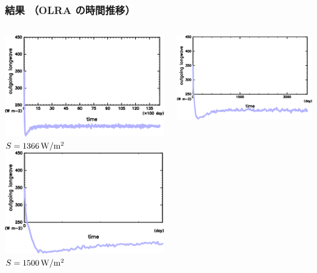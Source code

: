 \documentclass[aspectratio=149,9pt,fleqn]{beamer}
\begin{document}
\begin{frame}
	\frametitle{結果 （OLRA の時間推移）}
	\begin{columns}[T]
		\begin{column}{.3\textwidth}
			\centering
			\includegraphics[width=\textwidth]{S1366/S1300_OLRA_horimean_time0.0-14600.0-crop.png}
			\(S=1366\hmu{W/m^2}\)\\
			\includegraphics[width=\textwidth]{S1500/S1500_OLRA_horimean_time0.0-1095.0-crop.png}
			\(S=1500\hmu{W/m^2}\)
		\end{column}
		\begin{column}{.3\textwidth}
			\centering
			\includegraphics[width=\textwidth]{S1600/S1600_OLRA_horimean_time0.0-3650.0-crop.png}

\end{column}
\end{columns}
\end{frame}
\end{document}
